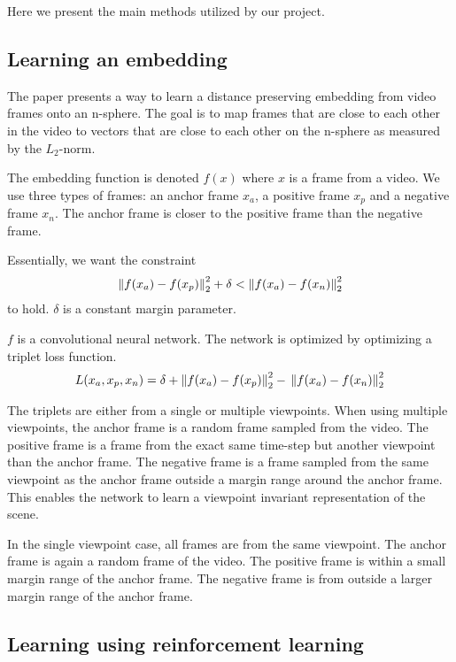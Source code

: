 
Here we present the main methods utilized by our project.

\subsection{Learning an embedding}

The paper \cite{self-supervised-learning} presents a way to learn a distance preserving embedding from video frames onto an n-sphere. The goal is to map frames that are close to each other in the video to vectors that are close to each other on the n-sphere as measured by the $L_2$-norm.

The embedding function is denoted $f(x)$ where $x$ is a frame from a video. We use three types of frames: an anchor frame $x_a$, a positive frame $x_p$ and a negative frame $x_n$. The anchor frame is closer to the positive frame than the negative frame.

Essentially, we want the constraint \[
    \left\lVert f(x_a) - f(x_p)\right\rVert^2_2 + \delta < \left\lVert f(x_a) - f(x_n)\right\rVert^2_2
    \] to hold. $\delta$ is a constant margin parameter.

$f$ is a convolutional neural network. The network is optimized by optimizing a triplet loss function. \[
    L(x_a, x_p, x_n) = \delta + \left\lVert f(x_a) - f(x_p)\right\rVert^2_2 - \\
    \left\lVert f(x_a) - f(x_n)\right\rVert^2_2
    \]

The triplets are either from a single or multiple viewpoints. When using multiple viewpoints, the anchor frame is a random frame sampled from the video. The positive frame is a frame from the exact same time-step but another viewpoint than the anchor frame. The negative frame is a frame sampled from the same viewpoint as the anchor frame outside a margin range around the anchor frame. This enables the network to learn a viewpoint invariant representation of the scene. \citep{self-supervised-learning}

In the single viewpoint case, all frames are from the same viewpoint. The anchor frame is again a random frame of the video. The positive frame is within a small margin range of the anchor frame. The negative frame is from outside a larger margin range of the anchor frame. \citep{self-supervised-learning}

\subsection{Learning using reinforcement learning}

